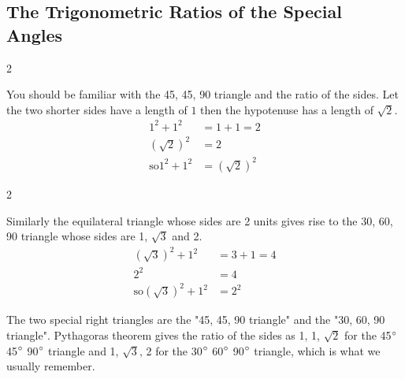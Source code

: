 \clearpage
\subsection{The Trigonometric Ratios of the Special Angles}
\columnsep =30pt
\begin {multicols}{2}
  
\setlength\fboxrule{0in}\setlength\fboxsep{0.2in}

You should be familiar with the 45, 45, 90 triangle and the ratio of the sides. Let
the two shorter sides have a length of $1$ then the hypotenuse has a length of $\sqrt{2}$. \\\relax
\begin{align*}1^{2} +1^{2} &  = 1 +1 =2 \\
\left (\sqrt{2}\right )^{2} &  = 2 \\
\text{so}1^{2} +1^{2} &  = \left (\sqrt{2}\right )^{2}\end{align*}


\end {multicols}



\columnsep =30pt
\begin {multicols}{2}
 

\setlength\fboxrule{0in}\setlength\fboxsep{0.2in}


Similarly the equilateral triangle whose sides are 2 units gives rise to the 30, 60, 90 triangle whose sides are 1, $\sqrt{3}$ and 2. \\\relax
\begin{align*}\left (\sqrt{3}\right )^{2} +1^{2} &  =  3 +1 =4 \\
2^{2} &  =  4 \\
\text{so}\left (\sqrt{3}\right )^{2} +1^{2} &  =  2^{2}\end{align*}


\end {multicols}


The two special right triangles are the "45, 45, 90 triangle" and the "30, 60, 90 triangle". Pythagoras
theorem gives the ratio of the sides as 1, 1, $\sqrt{2}$ for the 45$\mbox{{\ensuremath{{}^\circ}}}$ 45$\mbox{{\ensuremath{{}^\circ}}}$ 90$\mbox{{\ensuremath{{}^\circ}}}$ triangle and 1, $\sqrt{3}\text{,}$ 2 for the 30$\mbox{{\ensuremath{{}^\circ}}}$ 60$\mbox{{\ensuremath{{}^\circ}}}$ 90$\mbox{{\ensuremath{{}^\circ}}}$ triangle, which is what we usually remember. 

